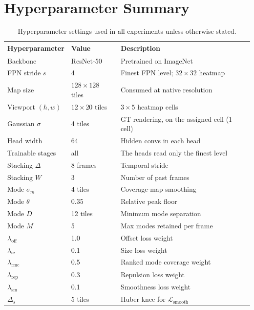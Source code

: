 \documentclass[preprint,12pt]{elsarticle}
\begin{document}
\section{Hyperparameter Summary}
\label{app:hyperparams}

\begin{table}[h]
  \centering
  \caption{Hyperparameter settings used in all experiments unless 
  otherwise stated.}
  \label{tab:hyperparams}
  \begin{tabular}{lll}
    \toprule
    Hyperparameter & Value & Description \\
    \midrule
    Backbone         & ResNet-50  & Pretrained on ImageNet \\
    FPN stride $s$   & 4          & Finest FPN level; $32{\times}32$ heatmap \\
    Map size         & $128{\times}128$ tiles & Consumed at native resolution \\
    Viewport $(h,w)$ & $12{\times}20$ tiles & $3{\times}5$ heatmap cells \\
    Gaussian $\sigma$  & 4 tiles  & GT rendering, on the assigned cell (1 cell) \\
    Head width         & 64       & Hidden convs in each head \\
    Trainable stages   & all      & The heads read only the finest level \\
    Stacking $\Delta$  & 8 frames & Temporal stride \\
    Stacking $W$       & 3        & Number of past frames \\
    Mode $\sigma_m$    & 4 tiles  & Coverage-map smoothing \\
    Mode $\theta$      & 0.35     & Relative peak floor \\
    Mode $D$           & 12 tiles & Minimum mode separation \\
    Mode $M$           & 5        & Max modes retained per frame \\
    $\lambda_{\text{off}}$   & 1.0 & Offset loss weight \\
    $\lambda_{\text{sz}}$    & 0.1 & Size loss weight \\
    $\lambda_{\text{rmc}}$   & 0.5 & Ranked mode coverage weight \\
    $\lambda_{\text{rep}}$   & 0.3 & Repulsion loss weight \\
    $\lambda_{\text{sm}}$    & 0.1  & Smoothness loss weight \\
    $\Delta_s$       & 5 tiles    & Huber knee for $\mathcal{L}_{\text{smooth}}$ \\

\end{tabular}
\end{table}
\end{document}
